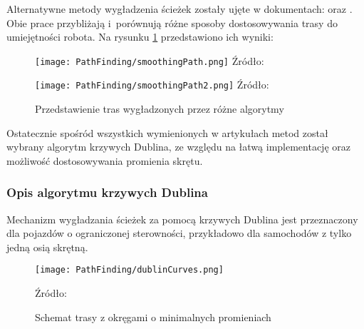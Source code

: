         Alternatywne metody wygładzenia ścieżek zostały ujęte w dokumentach:  \cite{Compare_PathSmoothing} oraz  \cite{Compare_PathSmoothing2}.
        Obie prace przybliżają i~porównują różne sposoby dostosowywania trasy do umiejętności robota.
        Na rysunku \ref{fig:smoothingPath_res} przedstawiono ich wyniki:
        \begin{figure}[!ht]
            \centering
            \begin{minipage}{0.49\textwidth}
                \centering
                \texttt{[image: PathFinding/smoothingPath.png]}
                Źródło: \cite{Compare_PathSmoothing} 
            \end{minipage}
            \begin{minipage}{0.49\textwidth}
                \centering
                \texttt{[image: PathFinding/smoothingPath2.png]}
                Źródło: \cite{Compare_PathSmoothing2} 
                \vspace{0.5cm}
            \end{minipage}
            \caption{Przedstawienie tras wygładzonych przez różne algorytmy}
            \label{fig:smoothingPath_res}
        \end{figure}

\newpage
        Ostatecznie spośród wszystkich wymienionych w artykułach metod został wybrany algorytm krzywych Dublina, ze względu na łatwą implementację oraz możliwość dostosowywania promienia skrętu.

\newpage
        \subsubsection{Opis algorytmu krzywych Dublina}
            Mechanizm wygładzania ścieżek za pomocą krzywych Dublina jest przeznaczony dla pojazdów o ograniczonej sterowności, przykładowo dla samochodów z tylko jedną osią skrętną.
            \begin{figure}[!ht]
                \centering
                \texttt{[image: PathFinding/dublinCurves.png]}
                \caption{Schemat trasy z okręgami o minimalnych promieniach}
                \label{fig:dublinCurves}
                Źródło: \cite{Compare_PathSmoothing} 
            \end{figure}


